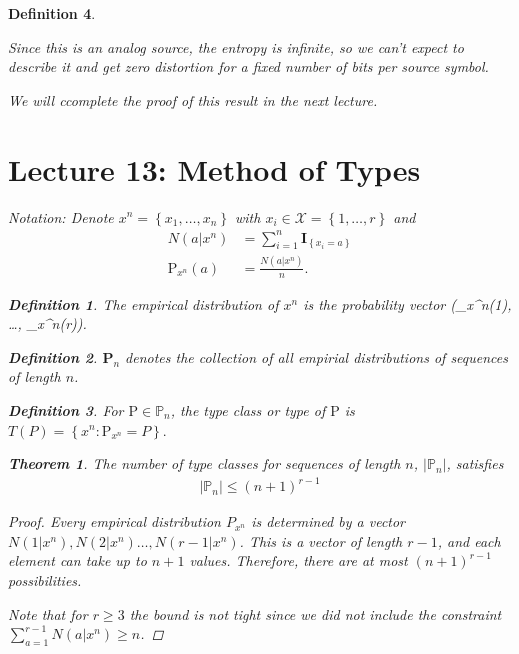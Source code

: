 \documentclass[13pt]{article}
\newtheorem*{theorem}{Theorem}
\newtheorem*{definition}{Definition}
\def\XX{\mathcal{X}}
\def\P{\text{P}}
\def\PP{\mathbb{P}}
\begin{document}
\begin{definition}
\begin{enumerate}
    Since this is an analog source, the entropy is infinite, so we can't expect to describe it and get zero distortion for a fixed number of bits per source symbol. 

    We will ccomplete the proof of this result in the next lecture.
\end{enumerate}

\section{Lecture 13: Method of Types}

Notation: Denote $x^n = \left\{ x_1, \dots, x_n \right\}$ with $x_i \in \XX = \left\{ 1, \dots, r \right\}$ and 
\begin{align*}
N(a | x^n) & = \sum_{i=1}^{n} \mathbf{I}_\left\{ x_i = a \right\} \\
\P_{x^n}(a) &= \frac{N(a | x^n)}{n}.
\end{align*}

\begin{definition}
  The empirical distribution of $x^n$ is the probability vector (\P_{x^n}(1), \dots, \P_{x^n}(r)).
\end{definition}

\begin{definition}
  $\mathbf{P}_n$ denotes the collection of all empirial distributions of sequences of length $n$.
\end{definition}

\begin{definition}
  For $\P \in \PP_n$, the type class or type of $\P$ is $T(P) = \left\{ x^n: \P_{x^n} = P \right\}.$
\end{definition}

\begin{theorem}
  The number of type classes for sequences of length $n$, $|\PP_n|$, satisfies
  \begin{align*}
    |\PP_n| \leq (n+1)^{r-1}
  \end{align*}
\end{theorem}

\begin{proof}
  Every empirical distribution $P_{x^n}$ is determined by a vector $N(1 | x^n), N(2 | x^n) \dots, N(r-1 | x^n)$.  This is a vector of length $r-1$, and each element can take up to $n+1$ values.  Therefore, there are at most $(n+1)^{r-1}$ possibilities.

  
  Note that for $r \geq 3$ the bound is not tight since we did not include the constraint $\sum_{a=1}^{r-1} N(a | x^n) \geq n$.
\end{proof}


\end{definition}
\end{document}
